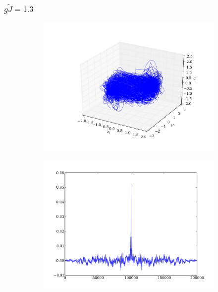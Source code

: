 \documentclass{beamer}
\begin{document}

\begin{frame}
\frametitle{$g\tilde{J} = 1.3$}
\begin{figure}
	\centering
	\begin{subfigure}[b]{0.49\textwidth}
		\includegraphics[width=\textwidth]{paulfigs/J_1_3_3d}
	\end{subfigure}
	\begin{subfigure}[b]{0.49\textwidth}
		\includegraphics[width=\textwidth]{paulfigs/tcorr_J_1_3}
	\end{subfigure}
\end{figure}
\end{frame}
\end{document}
